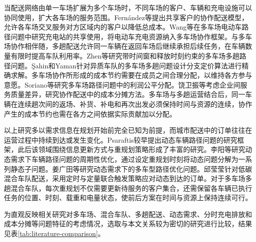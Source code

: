 \documentclass{setp-new}
\begin{document}
当配送网络由单一车场扩展为多个车场时，不同车场的客户、车辆和充电设施可以协同使用，扩大各车场的服务范围。Fernández等\cite{ref:49}提出共享客户的协作配送模型，允许各车场交叉服务对方区域内的客户以降低总成本。Wang等\cite{ref:7}在多车场电动车路径问题中研究充电站的共享使用，将电动车充电资源纳入多车场协作框架。与多车场协作相伴随，多趟配送允许同一车辆在返回车场后继续承担后续任务，在车辆数量有限时提高车队利用率。Zhen等\cite{ref:44}研究带时间窗和释放时刻约束的多车场多趟路径问题。Şahin和Yaman\cite{ref:sahin}针对异质车队的多车场多趟问题设计分支定价算法进行精确求解。多车场协作所形成的成本节约需要在成员之间合理分配，以维持各方参与意愿。Soriano等\cite{ref:8}研究多车场路径问题中的利润公平分配。饶卫振等\cite{ref:91}考虑企业间服务质量差异，研究协作配送中的成本分摊方法。多车场与多趟运营结合后，同一车辆在连续趟次间的返场、补货、补电和再次出发必须保持时间与资源的连续，协作产生的成本节约也需在各方之间依据实际贡献加以分配。

以上研究多以需求信息在规划开始前完全已知为前提，而城市配送中的订单往往在运营过程中持续到达或发生变化。Psaraftis\cite{ref:14}较早提出动态车辆路径问题的研究框架，此后该领域围绕信息更新方式与重规划策略形成了丰富的研究。李阳等\cite{ref:18}研究动态需求下车辆路径问题的周期性优化，通过设定重规划时刻将动态问题分解为一系列静态子问题。姜广田等\cite{ref:51}研究动态需求下的多车型路径优化问题。邱莹莹\cite{ref:71}针对低碳混合车队配送，采用定时与定量联合触发策略应对动态到达的订单。对于多车场多趟混合车队，每次重规划不仅需要更新待服务的客户集合，还需保留各车辆已执行任务的位置、时刻、载重和电量状态，使前后方案在时间与资源上保持连续可行。

为直观反映相关研究对多车场、混合车队、多趟配送、动态需求、分时充电排放和成本分摊等问题特征的考虑情况，选取与本文关系较为密切的研究进行比较，结果见表\ref{tab:literature-comparison}。
\end{document}
